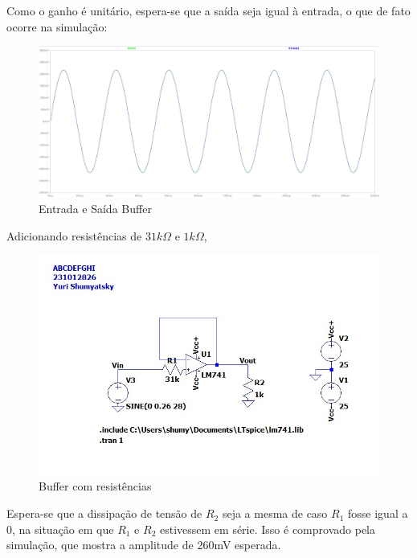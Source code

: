 \documentclass[10pt,twocolumn,letterpaper]{article}
\begin{document}
Como o ganho é unitário, espera-se que a saída seja igual à entrada, o que de fato ocorre na simulação:

\begin{figure}[h]
\caption{Entrada e Saída Buffer}
\begin{center}
\includegraphics[scale=0.14]{figuras/fig12}
\end{center}
\end{figure}

Adicionando resistências de $31k\Omega$ e $1k\Omega$, 

\begin{figure}[h]
\caption{Buffer com resistências}
\begin{center}
\includegraphics[scale=0.2]{figuras/fig13}
\end{center}
\end{figure}

Espera-se que a dissipação de tensão de $R_2$ seja a mesma de caso $R_1$ fosse igual a 0, na situação em que $R_1$ e $R_2$ estivessem em série. Isso é comprovado pela simulação, que mostra a amplitude de 260mV esperada. 
\end{document}

